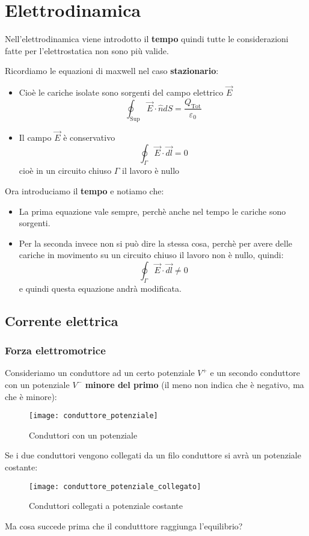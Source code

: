 \documentclass[a4paper]{article}
\begin{document}
\section{Elettrodinamica}
Nell'elettrodinamica viene introdotto il \textbf{tempo} quindi tutte le considerazioni
fatte per l'elettrostatica non sono più valide.

Ricordiamo le equazioni di maxwell nel caso \textbf{stazionario}:
\begin{itemize}
  \item 
    Cioè le cariche isolate sono sorgenti del campo elettrico \( \vec{E} \) 
    \[
      \oint_{\text{Sup}} \vec{E} \cdot \hat{n} dS = \frac{Q_{\text{Tot}}}{\varepsilon_0}
    \] 

  \item Il campo \( \vec{E} \) è conservativo
    \[
      \oint_{\Gamma} \vec{E} \cdot \vec{dl} = 0
    \] 
    cioè in un circuito chiuso \( \Gamma \) il lavoro è nullo
\end{itemize}
Ora introduciamo il \textbf{tempo} e notiamo che:
\begin{itemize}
  \item La prima equazione vale sempre, perchè anche nel tempo le cariche sono sorgenti.

  \item Per la seconda invece non si può dire la stessa cosa, perchè per avere delle 
    cariche in movimento su un circuito chiuso il lavoro non è nullo, quindi:
    \[
      \oint_{\Gamma } \vec{E} \cdot \vec{dl} \neq 0
    \] 
    e quindi questa equazione andrà modificata.
\end{itemize}

\subsection{Corrente elettrica}
\subsubsection{Forza elettromotrice}
Consideriamo un conduttore ad un certo potenziale \( V^+ \)  e un secondo conduttore con
un potenziale \( V^- \)  \textbf{minore del primo} (il meno non indica che è negativo,
ma che è minore):
\begin{figure}[H]
  \centering
  \texttt{[image: conduttore\_potenziale]}
  \caption{Conduttori con un potenziale}
\end{figure}
\noindent
Se i due conduttori vengono collegati da un filo conduttore si avrà un potenziale costante:
\begin{figure}[H]
  \centering
  \texttt{[image: conduttore\_potenziale\_collegato]}
  \caption{Conduttori collegati a potenziale costante}
\end{figure}
\noindent
Ma cosa succede prima che il condutttore raggiunga l'equilibrio?
\end{document}
